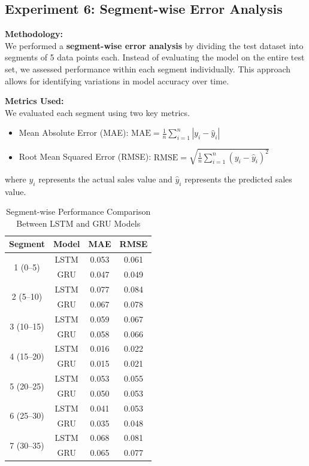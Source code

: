 \documentclass[conference]{IEEEtran}
\begin{document}
\subsection{Experiment 6: Segment-wise Error Analysis}

\textbf{Methodology:} \\
We performed a \textbf{segment-wise error analysis} by dividing the test dataset into segments of 5 data points each. Instead of evaluating the model on the entire test set, we assessed performance within each segment individually. This approach allows for identifying variations in model accuracy over time.

\textbf{Metrics Used:} \\
We evaluated each segment using two key metrics. \begin{itemize}
  \item Mean Absolute Error (MAE): $\text{MAE} = \frac{1}{n}\sum_{i=1}^{n}|y_i - \hat{y}_i|$
  \item Root Mean Squared Error (RMSE): $\text{RMSE} = \sqrt{\frac{1}{n}\sum_{i=1}^{n}(y_i - \hat{y}_i)^2}$
\end{itemize}
where $y_i$ represents the actual sales value and $\hat{y}_i$ represents the predicted sales value.

\begin{table}[h!]
\centering
\begin{tabular}{|c|c|c|c|}
\hline
\textbf{Segment} & \textbf{Model} & \textbf{MAE} & \textbf{RMSE} \\
\hline
\multirow{2}{*}{1 (0--5)}   & LSTM & 0.053 & 0.061 \\
                          & GRU  & 0.047 & 0.049 \\
\hline
\multirow{2}{*}{2 (5--10)}  & LSTM & 0.077 & 0.084 \\
                          & GRU  & 0.067 & 0.078 \\
\hline
\multirow{2}{*}{3 (10--15)}  & LSTM & 0.059 & 0.067 \\
                           & GRU  & 0.058 & 0.066 \\
\hline
\multirow{2}{*}{4 (15--20)}  & LSTM & 0.016 & 0.022 \\
                           & GRU  & 0.015 & 0.021 \\
\hline
\multirow{2}{*}{5 (20--25)}  & LSTM & 0.053 & 0.055 \\
                           & GRU  & 0.050 & 0.053 \\
\hline
\multirow{2}{*}{6 (25--30)}  & LSTM & 0.041 & 0.053 \\
                           & GRU  & 0.035 & 0.048 \\
\hline
\multirow{2}{*}{7 (30--35)}  & LSTM & 0.068 & 0.081 \\
                           & GRU  & 0.065 & 0.077 \\
\hline
\end{tabular}
\caption{Segment-wise Performance Comparison Between LSTM and GRU Models}
\end{table}
\end{document}
